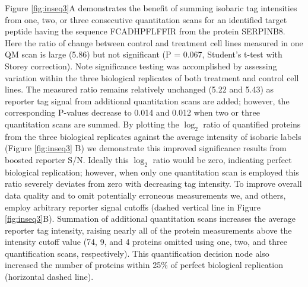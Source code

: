 Figure \ref{fig:inseq3}A demonstrates the benefit of summing isobaric tag intensities from one, two, or three consecutive quantitation scans for an \inseq{} identified target peptide having the sequence FCADHPFLFFIR from the protein SERPINB8. Here the ratio of change between control and treatment cell lines measured in one QM scan is large (5.86) but not significant (P = 0.067, Student's t-test with Storey correction).\cite{storey} Note significance testing was accomplished by assessing variation within the three biological replicates of both treatment and control cell lines. The measured ratio remains relatively unchanged (5.22 and 5.43) as reporter tag signal from additional quantitation scans are added; however, the corresponding P-values decrease to 0.014 and 0.012 when two or three quantitation scans are summed. By plotting the $\log_2$ ratio of quantified proteins from the three biological replicates against the average intensity of isobaric labels (Figure \ref{fig:inseq3} B) we demonstrate this improved significance results from boosted reporter S/N. Ideally this $\log_2$ ratio would be zero, indicating perfect biological replication; however, when only one quantitation scan is employed this ratio severely deviates from zero with decreasing tag intensity. To improve overall data quality and to omit potentially erroneous measurements we, and others, employ arbitrary reporter signal cutoffs (dashed vertical line in Figure \ref{fig:inseq3}B). Summation of additional quantitation scans increases the average reporter tag intensity, raising nearly all of the protein measurements above the intensity cutoff value (74, 9, and 4 proteins omitted using one, two, and three quantification scans, respectively). This quantification decision node also increased the number of proteins within 25\% of perfect biological replication (horizontal dashed line).

